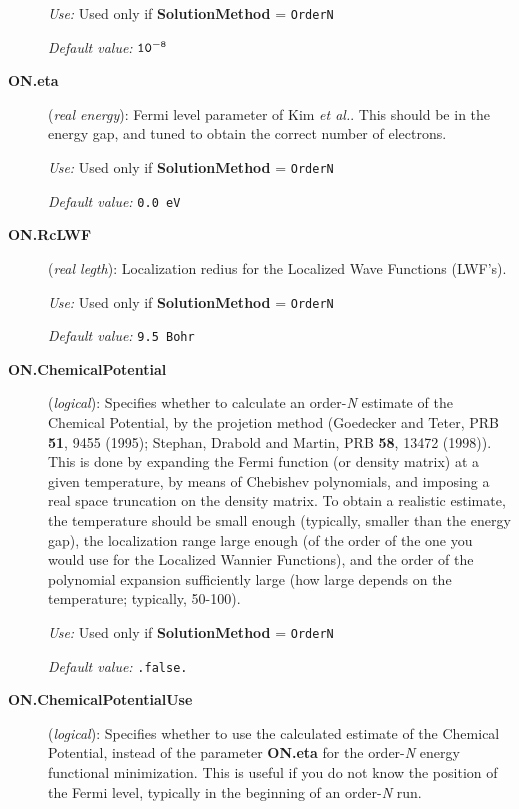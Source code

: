 \documentclass[11pt]{article}
\begin{document}
\begin{description}
{\it Use:} Used only if {\bf SolutionMethod} = {\tt OrderN}

{\it Default value:} ${\tt 10^{-8}}$

\item[{\bf ON.eta}] ({\it real energy}): 
Fermi level parameter of Kim 
{\it et al.}. This should be in the energy gap, and tuned to obtain
the correct number of electrons.

{\it Use:} Used only if {\bf SolutionMethod} = {\tt OrderN}

{\it Default value:} {\tt 0.0 eV}

\item[{\bf ON.RcLWF}] ({\it real legth}): 
Localization redius for the Localized Wave Functions (LWF's).

{\it Use:} Used only if  {\bf SolutionMethod} = {\tt OrderN}

{\it Default value:} {\tt 9.5 Bohr}
        
\item[{\bf ON.ChemicalPotential}] ({\it logical}): 
Specifies whether to calculate an order-{\it N} estimate of the
Chemical Potential, by the projetion method 
(Goedecker and Teter, PRB {\bf 51}, 9455 (1995); 
Stephan, Drabold and Martin, PRB {\bf 58}, 13472 
(1998)). This is
done by expanding the Fermi function (or density matrix)
at a given temperature, by means of Chebishev
polynomials, and imposing a
real space truncation on the density matrix.
To obtain a realistic estimate, the temperature 
should be small enough (typically, smaller than
the energy gap), the localization range large enough
(of the order of the one you would use for the Localized Wannier
Functions), and the order of the polynomial expansion
sufficiently large (how large depends on the temperature; 
typically, 50-100).

{\it Use:} Used only if {\bf SolutionMethod} = {\tt OrderN}

{\it Default value:} {\tt .false.}

\item[{\bf ON.ChemicalPotentialUse}] ({\it logical}): 
Specifies whether to use the calculated estimate of the
Chemical Potential, instead of the parameter 
{\bf ON.eta} 
for the order-{\it N} energy functional minimization.
This is useful if you do not know the position
of the Fermi level, typically in the beginning
of an order-{\em N} run.


\end{description}
\end{document}
